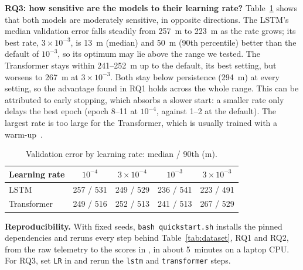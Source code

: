 \documentclass[sigconf]{acmart}
\begin{document}
\textbf{RQ3: how sensitive are the models to their learning rate?} Table~\ref{tab:rq3} shows that both models are moderately sensitive, in opposite directions. The LSTM's median validation error falls steadily from 257~m to 223~m as the rate grows; its best rate, $3{\times}10^{-3}$, is 13~m (median) and 50~m (90th percentile) better than the default of $10^{-3}$, so its optimum may lie above the range we tested. The Transformer stays within 241--252~m up to the default, its best setting, but worsens to 267~m at $3{\times}10^{-3}$. Both stay below persistence (294~m) at every setting, so the advantage found in RQ1 holds across the whole range. This can be attributed to early stopping, which absorbs a slower start: a smaller rate only delays the best epoch (epoch 8--11 at $10^{-4}$, against 1--2 at the default). The largest rate is too large for the Transformer, which is usually trained with a warm-up~\cite{vaswani2017attention}.

\begin{table}[!ht]
\centering\footnotesize
\caption{Validation error by learning rate: median / 90th (m).}
\label{tab:rq3}
\begin{tabular}{@{}lcccc@{}}
\toprule
Learning rate & $10^{-4}$ & $3{\times}10^{-4}$ & $10^{-3}$ & $3{\times}10^{-3}$ \\
\midrule
LSTM        & 257 / 531 & 249 / 529 & 236 / 541 & 223 / 491 \\
Transformer & 249 / 516 & 252 / 513 & 241 / 513 & 267 / 529 \\
\bottomrule
\end{tabular}
\end{table}


\textbf{Reproducibility.} With fixed seeds, \texttt{bash quickstart.sh} installs the pinned dependencies and reruns every step behind Table~\ref{tab:dataset}, RQ1 and RQ2, from the raw telemetry to the scores in , in about 5~minutes on a laptop CPU. For RQ3, set \texttt{LR} in  and rerun the \texttt{lstm} and \texttt{transformer} steps.




\end{document}
